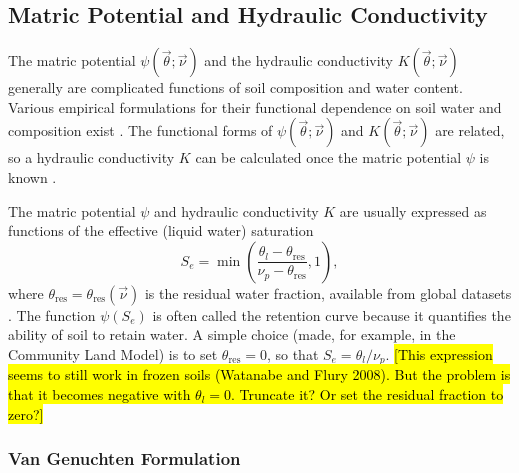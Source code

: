 \documentclass{report}
\begin{document}
\subsection{Matric Potential and Hydraulic Conductivity}

The matric potential $\psi(\vec{\theta}; \vec{\nu})$ and the hydraulic conductivity $K(\vec{\theta}; \vec{\nu})$ generally are complicated functions of soil composition and water content. Various empirical formulations for their functional dependence on soil water and composition exist \citep[e.g.,][]{Dingman15a, Bear18a, Bonan19a}. The functional forms of $\psi(\vec{\theta}; \vec{\nu})$ and $K(\vec{\theta}; \vec{\nu})$ are related, so a hydraulic conductivity $K$ can be calculated once the matric potential $\psi$ is known \citep{Mualem76a}. 

The matric potential $\psi$ and hydraulic conductivity $K$ are usually expressed as functions of the effective (liquid water) saturation
\begin{equation}
    S_e = \min \left(\frac{\theta_l - \theta_{\mathrm{res}}}{\nu_p - \theta_{\mathrm{res}}}, 1 \right),
\end{equation}
where  $\theta_{\mathrm{res}} = \theta_{\mathrm{res}}(\vec{\nu})$ is the residual water fraction, available from global datasets \citep{Dai19b}. The function $\psi(S_e)$ is often called the retention curve because it quantifies the ability of soil to retain water. A simple choice (made, for example, in the Community Land Model) is to set $\theta_{\mathrm{res}} = 0$, so that $S_e = \theta_l/\nu_p$. \hl{[This expression seems to still work in frozen soils (Watanabe and Flury 2008). But the problem is that it becomes negative with $\theta_l=0$. Truncate it? Or set the residual fraction to zero?]}

\subsubsection{Van Genuchten Formulation} 
\end{document}
